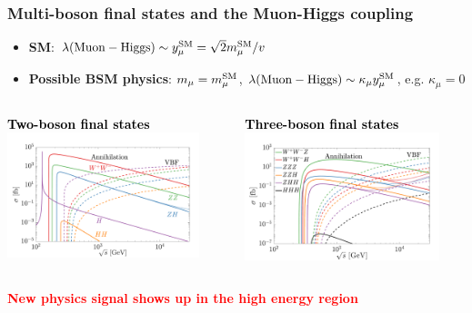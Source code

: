 \documentclass[aspectratio=169]{beamer}
\begin{document}
\begin{frame}
	\frametitle{Multi-boson final states and the Muon-Higgs coupling}
		\begin{itemize}
			\item \textcolor{PittRoyal}{\bf SM}: $\lambda ({\rm Muon-Higgs})\sim y_\mu^{\rm SM} = \sqrt{2}m_\mu^{\rm SM}/v$
			\item \textcolor{PittRoyal}{\bf Possible BSM physics}: $m_\mu=m_\mu^{\rm SM}$, \textcolor{red}{$\lambda ({\rm Muon-Higgs})\sim \kappa_\mu y_\mu^{\rm SM}$}, e.g. $\kappa_\mu=0$
		\end{itemize}
	\begin{columns}
		\begin{column}{0.5\textwidth}
			\textcolor{black}{\bf Two-boson final states}
		\centering
		\includegraphics[width=0.88\textwidth]{figs/BB3.pdf}
		\end{column}
		\begin{column}{0.5\textwidth}
			\textcolor{black}{\bf Three-boson final states}
		\centering
		\includegraphics[width=0.88\textwidth]{figs/BBB2.pdf}
		\end{column}
		\end{columns}
	
 \textcolor{red}{\bf  New physics signal shows up in the high energy region}
\end{frame}
\end{document}
